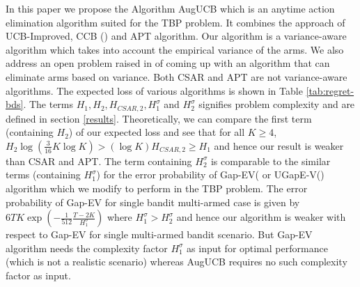 In this paper we propose the Algorithm AugUCB which is an anytime action elimination algorithm suited for the TBP problem. It combines the approach of UCB-Improved, CCB (\cite{liu2016modification}) and APT algorithm. Our algorithm is a variance-aware algorithm which takes into account the empirical variance of the arms. We also address an open problem raised in \cite{auer2010ucb} of coming up with an algorithm that can eliminate arms based on variance. Both CSAR and APT are not variance-aware algorithms. The expected loss of various algorithms is shown in Table \ref{tab:regret-bds}. The terms $H_1, H_2, H_{CSAR,2}, H_1^{\sigma}$ and $H_2^{\sigma}$ signifies problem complexity and are defined in section \ref{results}. Theoretically, we can compare the first term (containing $H_2$) of our expected loss and see that for all $K\geq 4$, $ H_2 \log(\frac{3}{16} K\log K) > (\log K)H_{CSAR,2}\geq H_1 $ and hence our result is weaker than CSAR and APT. The term containing $H_{2}^{\sigma}$ is comparable to the similar terms (containing $H_1^{\sigma}$) for the error probability of Gap-EV(\cite{gabillon2011multi} or UGapE-V(\cite{gabillon2012best}) algorithm which we modify to perform in the TBP problem. The error probability of Gap-EV for single bandit multi-armed case is given by $6TK\exp(-\frac{1}{512}\frac{T-2K}{H_1^{\sigma}})$ where $H_1^{\sigma} > H_2^{\sigma}$ and hence our algorithm is weaker with respect to Gap-EV for single  multi-armed bandit scenario. But Gap-EV algorithm needs the complexity factor $H_1^{\sigma}$ as input for optimal performance (which is not a realistic scenario) whereas AugUCB requires no such complexity factor as input. 

